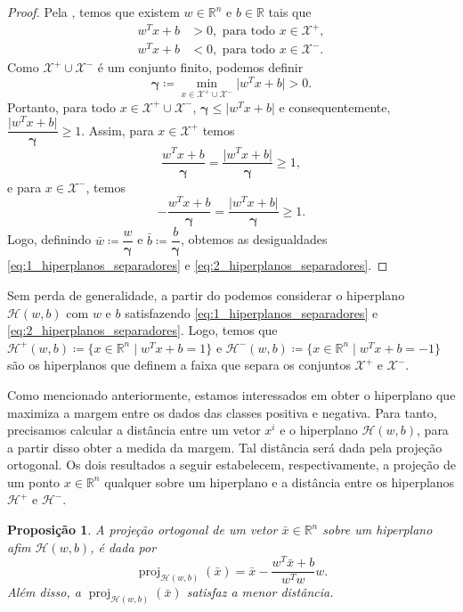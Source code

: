 \documentclass[12pt,a4paper]{scrartcl}
\DeclareMathOperator{\proj}{proj}
\def\Xset{\mathcal{X}}
\def\Hset{\mathcal{H}}
\def\RR{\mathds{R}}
\def\xbar{\bar{x}}
\def\wbar{\bar{w}}
\def\bbar{\bar{b}}
\newtheorem{prop}{Proposição}
\theoremstyle{definition}%
\begin{document}
\begin{proof}
Pela  , temos que existem $w\in \RR^n$ e $b\in \RR$ tais que
\begin{align}
w^{T}x+b &>0, \text{ para todo } x\in \Xset^{+}, \\
w^{T}x+b &<0, \text{ para todo } x\in \Xset^{-}.
\end{align}  
Como $\Xset^{+}\cup \Xset^{-}$ é um conjunto finito, podemos definir
\[ \boldsymbol{\gamma} \coloneqq \min_{x\in \Xset^{+}\cup \Xset^{-}} \vert w^{T}x+b\vert  >0. \]
Portanto, para todo $x\in \Xset^{+}\cup \Xset^{-}$, $\boldsymbol{\gamma} \leq \vert w^{T}x+b\vert$ e consequentemente, $\dfrac{\vert w^{T}x+b\vert }{\boldsymbol{\gamma}} \geq 1$. Assim, para $x\in \Xset^{+}$ temos
\[ \dfrac{w^{T}x+b}{\boldsymbol{\gamma}} = \dfrac{\vert w^{T}x+b\vert }{\boldsymbol{\gamma}} \geq 1, \]
e para $x\in \Xset^{-}$, temos
\[- \dfrac{w^{T}x+b}{\boldsymbol{\gamma}} = \dfrac{\vert w^{T}x+b\vert }{\boldsymbol{\gamma}} \geq 1. \]
Logo, definindo $\wbar \coloneqq \dfrac{w}{\boldsymbol{\gamma}}$ e $\bbar \coloneqq \dfrac{b}{\boldsymbol{\gamma}}$, obtemos as desigualdades \eqref{eq:1_hiperplanos_separadores} e \eqref{eq:2_hiperplanos_separadores}. 

\end{proof}


Sem perda de generalidade, a partir do  podemos considerar o hiperplano $\Hset (w,b)$ com $w$ e $b$ satisfazendo \eqref{eq:1_hiperplanos_separadores} e \eqref{eq:2_hiperplanos_separadores}. Logo, temos que $\Hset^{+} (w,b) \coloneqq \{x\in \RR^n \mid w^{T}x+b= 1\}$ e $\Hset^{-} (w,b) \coloneqq \{x\in \RR^n \mid w^{T}x+b= -1\}$ são os hiperplanos que definem a faixa que separa os conjuntos $\Xset^{+}$ e $\Xset^{-}$.

Como mencionado anteriormente, estamos interessados em obter o hiperplano que maximiza a margem entre os dados das classes positiva e negativa. Para tanto, precisamos calcular a distância entre um vetor $x^{i}$ e o hiperplano $\Hset(w,b)$, para a partir disso obter a medida da margem. Tal distância será dada pela projeção ortogonal. Os dois resultados a seguir estabelecem, respectivamente, a projeção de um ponto $x \in \RR^{n}$ qualquer sobre um hiperplano e a distância entre os hiperplanos $\Hset^{+}$ e $\Hset^{-}$.

\begin{prop} \label{prop:projecao_ortogonal_sobre_hiperplano} 
A projeção ortogonal de um vetor $\xbar\in \RR^n$ sobre um hiperplano afim $\Hset(w,b)$, é dada por
\[ \proj_{\Hset (w,b)}(\xbar)= \xbar - \dfrac{w^{T}\xbar+b}{w^{T}w}w. \]
Além disso, a $\proj_{\Hset (w,b)}(\xbar)$ satisfaz a menor distância.
\end{prop}
\end{document}
